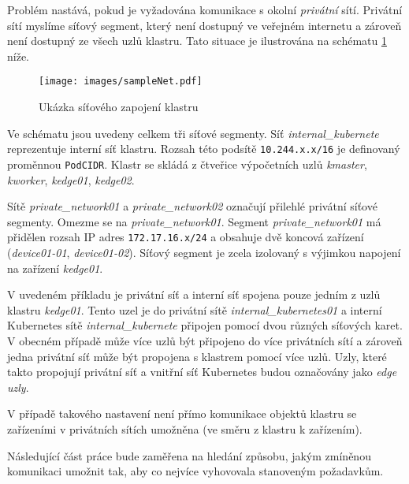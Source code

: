 Problém nastává, pokud je vyžadována komunikace s okolní \textit{privátní} sítí. Privátní sítí myslíme síťový segment, který není dostupný ve veřejném internetu a zároveň není dostupný ze všech uzlů klastru. Tato situace je ilustrována na schématu \ref{fig:schema} níže.

\begin{figure}[!ht]
    \centering
    \texttt{[image: images/sampleNet.pdf]}
    \caption{Ukázka síťového zapojení klastru}
    \label{fig:schema}
\end{figure}

Ve schématu jsou uvedeny celkem tři síťové segmenty. Síť \textit{internal\_kubernete} reprezentuje interní síť klastru.  Rozsah této podsítě \verb|10.244.x.x/16| je definovaný proměnnou \verb|PodCIDR|. Klastr se skládá z čtveřice výpočetních uzlů \textit{kmaster}, \textit{kworker}, \textit{kedge01}, \textit{kedge02}. 

Sítě \textit{private\_network01} a \textit{private\_network02} označují přilehlé privátní síťové segmenty. Omezme se na \textit{private\_network01}. Segment \textit{private\_network01} má přidělen rozsah IP adres \verb|172.17.16.x/24| a obsahuje dvě koncová zařízení (\textit{device01-01}, \textit{device01-02}). Síťový segment je zcela izolovaný s výjimkou napojení na zařízení \textit{kedge01}.

V uvedeném příkladu je privátní síť a interní síť spojena pouze jedním z uzlů klastru \textit{kedge01}. Tento uzel je do privátní sítě \textit{internal\_kubernetes01} a interní Kubernetes sítě \textit{internal\_kubernete} připojen pomocí dvou různých síťových karet. V obecném případě může více uzlů být připojeno do více privátních sítí a zároveň jedna privátní síť může být propojena s klastrem pomocí více uzlů. Uzly, které takto propojují privátní síť a vnitřní síť Kubernetes budou označovány jako \textit{edge uzly}.

\bigskip

V případě takového nastavení není přímo komunikace objektů klastru se zařízeními v privátních sítích umožněna (ve směru z klastru k zařízením).

Následující část práce bude zaměřena na hledání způsobu, jakým zmíněnou komunikaci umožnit tak, aby co nejvíce vyhovovala stanoveným požadavkům.

